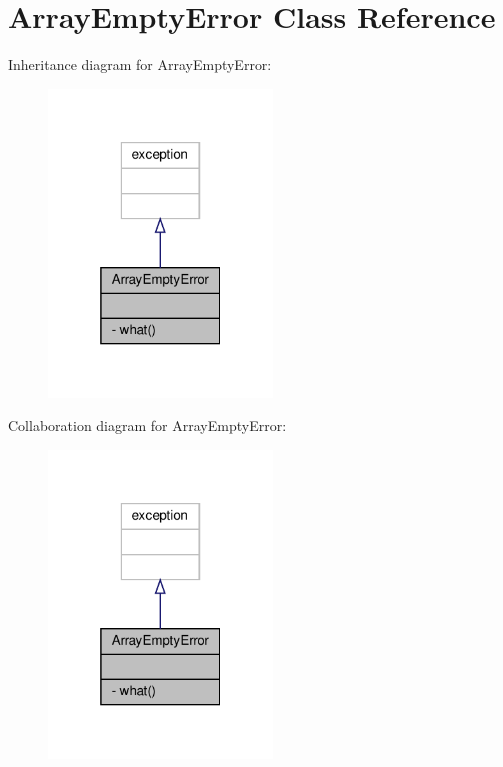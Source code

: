 \hypertarget{classArrayEmptyError}{}\section{Array\+Empty\+Error Class Reference}
\label{classArrayEmptyError}


Inheritance diagram for Array\+Empty\+Error\+:\nopagebreak
\begin{figure}[H]
\begin{center}
\leavevmode
\includegraphics[width=169pt]{classArrayEmptyError__inherit__graph}
\end{center}
\end{figure}


Collaboration diagram for Array\+Empty\+Error\+:\nopagebreak
\begin{figure}[H]
\begin{center}
\leavevmode
\includegraphics[width=169pt]{classArrayEmptyError__coll__graph}
\end{center}
\end{figure}
